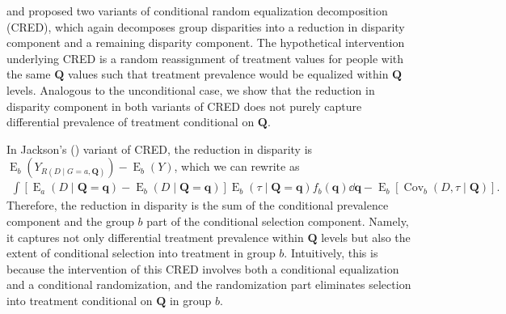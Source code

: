 \documentclass[12pt,a4paper]{article}
\newcommand{\Cov}{\operatorname{Cov}}
\newcommand{\E}{\operatorname{E}}
\def\Q{{\boldsymbol Q}}
\def\q{{\boldsymbol q}}
\begin{document}
\citet{jackson_meaningful_2021} and \citet{lundberg_gap-closing_2022} proposed two variants of conditional random equalization decomposition (CRED), which again decomposes group disparities into a reduction in disparity component and a remaining disparity component. The hypothetical intervention underlying CRED is a random reassignment of treatment values for people with the same $\Q$ values such that treatment prevalence would be equalized within $\Q$ levels. Analogous to the unconditional case, we show that the reduction in disparity component in both variants of CRED does not purely capture differential prevalence of treatment conditional on $\Q$. 

In Jackson's (\citeyear{jackson_meaningful_2021}) variant of CRED, the reduction in disparity is $\E_b(Y_{R(D \mid G=a, \Q)})-\E_b(Y)$, which we can rewrite as 
\begin{gather}
\int  [\E_a(D \mid \Q=\q) - \E_b(D \mid \Q=\q)] \E_b(\tau \mid \Q=\q) f_b(\q) \dd \q - \E_b[\Cov_b(D, \tau \mid \Q)]. 
\end{gather}
Therefore, the reduction in disparity is the sum of the conditional prevalence component and the group $b$ part of the conditional selection component. Namely, it captures not only differential treatment prevalence within $\Q$ levels but also the extent of conditional selection into treatment in group $b$. Intuitively, this is because the intervention of this CRED involves both a conditional equalization and a conditional randomization, and the randomization part eliminates selection into treatment conditional on $\Q$ in group $b$. 
\end{document}
